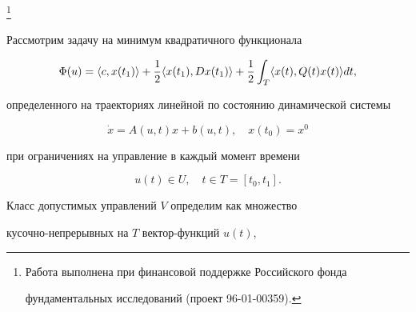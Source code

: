  


\thanks{Работа выполнена при финансовой поддержке Российского фонда 


фундаментальных исследований (проект 96-01-00359).} 


\date{} 




 


\pagestyle{plain} %


 


 




 


\maketitle 


\label{begin} 


 


Рассмотрим задачу на минимум квадратичного функционала 


\begin{equation} 


\Phi(u)=\la c,x(t_1)\ra+\frac{1}{2}\la x(t_1),Dx(t_1)\ra+ 


\frac{1}{2}\int_T\la x(t),Q(t)x(t)\ra dt, 


\end{equation} 


определенного на траекториях линейной по состоянию динамической системы 


\begin{equation} 


\Dot x=A(u,t)x+b(u,t),\quad x(t_0)=x^0 


\end{equation} 


при ограничениях на управление в каждый момент времени 


\begin{equation} 


u(t)\in U,\quad t\in T=[t_0,t_1]. 


\end{equation} 


Класс допустимых управлений $V$ определим как множество 


кусочно-непрерывных на $T$ вектор-функций $u(t)$, 


